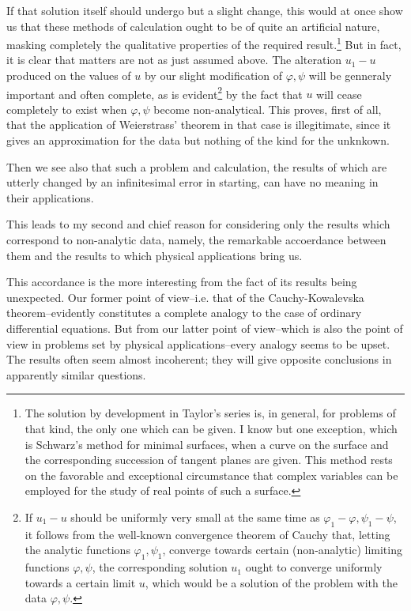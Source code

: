 \documentclass[12pt,oneside]{book}
\begin{document}
If that solution itself should undergo but a slight change, this would at once show us that these methods of calculation ought to be of quite an artificial nature, masking completely the qualitative properties of the required result.\footnote{The solution by development in Taylor's series is, in general, for problems of that kind, the only one which can be given. I know but one exception, which is Schwarz's method for minimal surfaces, when a curve on the surface and the corresponding succession of tangent planes are given. This method rests on the favorable and exceptional circumstance that complex variables can be employed for the study of real points of such a surface.} But in fact, it is clear that matters are not as just assumed above. The alteration $u_1-u$ produced on the values of $u$ by our slight modification of $\varphi,\psi$ will be genneraly important and often complete, as is evident\footnote{If $u_1-u$ should be uniformly very small at the same time as $\varphi_1-\varphi,\psi_1-\psi$, it follows from the well-known convergence theorem of Cauchy that, letting the analytic functions $\varphi_1,\psi_1$, converge towards certain (non-analytic) limiting functions $\varphi,\psi$, the corresponding solution $u_1$ ought to converge uniformly towards a certain limit $u$, which would be a solution of the problem with the data $\varphi,\psi$.} by the fact that $u$ will cease completely to exist when $\varphi,\psi$ become non-analytical. This proves, first of all, that the application of Weierstrass' theorem in that case is illegitimate, since it gives an approximation for the data but nothing of the kind for the unknkown. \par

Then we see also that such a problem and calculation, the results of which are utterly changed by an infinitesimal error in starting, can have no meaning in their applications. \par 

This leads to my second and chief reason for considering only the results which correspond to non-analytic data, namely, the remarkable accoerdance between them and the results to which physical applications bring us. \par 

This accordance is the more interesting from the fact of its results being unexpected. Our former point of view--i.e. that of the Cauchy-Kowalevska theorem--evidently constitutes a complete analogy to the case of ordinary differential equations. But from our latter point of view--which is also the point of view in problems set by physical applications--every analogy seems to be upset. The results often seem almost incoherent; they will give opposite conclusions in apparently similar questions. \par 
\end{document}

